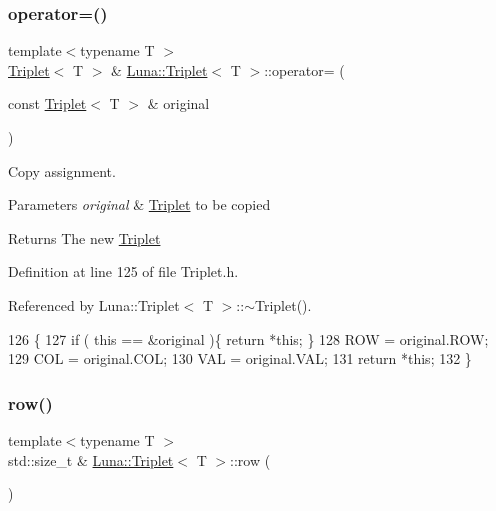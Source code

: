 \subsubsection{\texorpdfstring{operator=()}{operator=()}}
{\footnotesize\ttfamily template$<$typename T $>$ \\
\hyperlink{classLuna_1_1Triplet}{Triplet}$<$ T $>$ \& \hyperlink{classLuna_1_1Triplet}{Luna\+::\+Triplet}$<$ T $>$\+::operator= (\begin{DoxyParamCaption}\item[{const \hyperlink{classLuna_1_1Triplet}{Triplet}$<$ T $>$ \&}]{original }\end{DoxyParamCaption})\hspace{0.3cm}{\ttfamily [inline]}}



Copy assignment. 


\begin{DoxyParams}{Parameters}
{\em original} & \hyperlink{classLuna_1_1Triplet}{Triplet} to be copied \\
\hline
\end{DoxyParams}
\begin{DoxyReturn}{Returns}
The new \hyperlink{classLuna_1_1Triplet}{Triplet} 
\end{DoxyReturn}


Definition at line 125 of file Triplet.\+h.



Referenced by Luna\+::\+Triplet$<$ T $>$\+::$\sim$\+Triplet().


\begin{DoxyCode}
126   \{
127     \textcolor{keywordflow}{if} ( \textcolor{keyword}{this} == &original )\{ \textcolor{keywordflow}{return} *\textcolor{keyword}{this}; \}
128     ROW = original.ROW;
129         COL = original.COL;
130         VAL = original.VAL;
131     \textcolor{keywordflow}{return} *\textcolor{keyword}{this};
132   \}
\end{DoxyCode}
\mbox{\label{classLuna_1_1Triplet_aea4263baad8dcba4eb238c404f1ad2e7}} 
\subsubsection{\texorpdfstring{row()}{row()}}
{\footnotesize\ttfamily template$<$typename T $>$ \\
std\+::size\+\_\+t \& \hyperlink{classLuna_1_1Triplet}{Luna\+::\+Triplet}$<$ T $>$\+::row (\begin{DoxyParamCaption}{ }\end{DoxyParamCaption})\hspace{0.3cm}{\ttfamily [inline]}}



